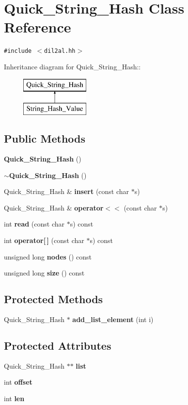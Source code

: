 \section{Quick\_\-String\_\-Hash  Class Reference}
\label{classQuick__String__Hash}
{\tt \#include $<$dil2al.hh$>$}

Inheritance diagram for Quick\_\-String\_\-Hash::\begin{figure}[H]
\begin{center}
\leavevmode
\includegraphics[height=2cm]{classQuick__String__Hash}
\end{center}
\end{figure}
\subsection*{Public Methods}
\begin{CompactItemize}
\item 
{\bf Quick\_\-String\_\-Hash} ()
\item 
{\bf $\sim$Quick\_\-String\_\-Hash} ()
\item 
Quick\_\-String\_\-Hash \& {\bf insert} (const char $\ast$s)
\item 
Quick\_\-String\_\-Hash \& {\bf operator$<$$<$} (const char $\ast$s)
\item 
int {\bf read} (const char $\ast$s) const
\item 
int {\bf operator[$\,$]} (const char $\ast$s) const
\item 
unsigned long {\bf nodes} () const
\item 
unsigned long {\bf size} () const
\end{CompactItemize}
\subsection*{Protected Methods}
\begin{CompactItemize}
\item 
Quick\_\-String\_\-Hash $\ast$ {\bf add\_\-list\_\-element} (int i)
\end{CompactItemize}
\subsection*{Protected Attributes}
\begin{CompactItemize}
\item 
Quick\_\-String\_\-Hash $\ast$$\ast$ {\bf list}
\item 
int {\bf offset}
\item 
int {\bf len}
\end{CompactItemize}


